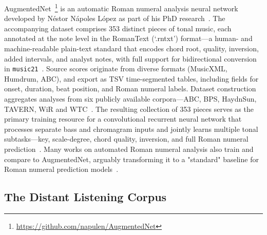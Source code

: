 \documentclass[sigconf]{acmart} %
\begin{document}
AugmentedNet~\footnote{\url{https://github.com/napulen/AugmentedNet}} is an automatic Roman numeral analysis neural network developed by Néstor Nápoles López as part of his PhD research~\cite{NapolesLopez2022_AutomaticRomanNumeral}. The accompanying dataset comprises 353 distinct pieces of tonal music, each annotated at the note level in the RomanText (`.rntxt') format---a human- and machine-readable plain-text standard that encodes chord root, quality, inversion, added intervals, and analyst notes, with full support for bidirectional conversion in \texttt{music21}~\cite{Cuthbert2010_Music21ToolkitComputeraided}. Source scores originate from diverse formats (MusicXML, Humdrum, ABC), and export as TSV time-segmented tables, including fields for onset, duration, beat position, and Roman numeral labels. Dataset construction aggregates analyses from six publicly available corpora---ABC, BPS, HaydnSun, TAVERN, WiR and WTC~\cite{Neuwirth2018_AnnotatedBeethovenCorpus,Chen2018_FunctionalHarmonyRecognition,NapolesLopez2017_JosephHaydnString,Devaney2015_ThemeVariationEncodings,Gotham2023_WhenRomeMetacorpus}.
The resulting collection of 353 pieces serves as the primary training resource for a convolutional recurrent neural network that processes separate bass and chromagram inputs and jointly learns multiple tonal subtasks---key, scale-degree, chord quality, inversion, and full Roman numeral prediction~\cite{NapolesLopez2021_AugmentedNetRomanNumeral}. Many works on automated Roman numeral analysis also train and compare to AugmentedNet, arguably transforming it to a "standard" baseline for Roman numeral prediction models~\cite{Karystinaios2023_RomanNumeralAnalysis, Sailor2024_RNBertFineTuningMasked}.


\subsection{The Distant Listening Corpus}
\end{document}
